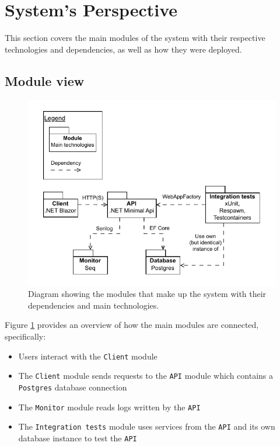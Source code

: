 \section{System's Perspective}
\label{ch:sys_persp} %

This section covers the main modules of the system with their  
respective technologies and dependencies, as well as how they
were deployed.

\subsection{Module view}

\begin{figure}[H]
    \centering
    \includegraphics[width=\linewidth]{images/modules.drawio.pdf}
    \caption{Diagram showing the modules that make up the system with
    their dependencies and main technologies.}
    \label{fig:modules}
\end{figure}

Figure \ref{fig:modules} provides an overview of how the main modules are connected, specifically:
\begin{itemize}
    \item Users interact with the \texttt{Client} module
    \item The \texttt{Client} module sends requests to the \texttt{API} module which contains a \texttt{Postgres} database connection
    \item The \texttt{Monitor} module reads logs written by the \texttt{API}
    \item The \texttt{Integration tests} module uses services from the \texttt{API} and its own database instance to test the \texttt{API}
\end{itemize}

